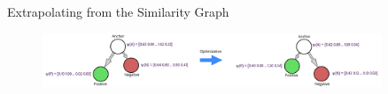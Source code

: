 \begin{frame}{Extrapolating from the Similarity Graph}

\begin{figure}[!htb]
\centering
\includegraphics[width=0.9\textwidth]{Images/triplet_loss.png}
\label{fig:triplet_loss}
\end{figure}
    
\end{frame}
